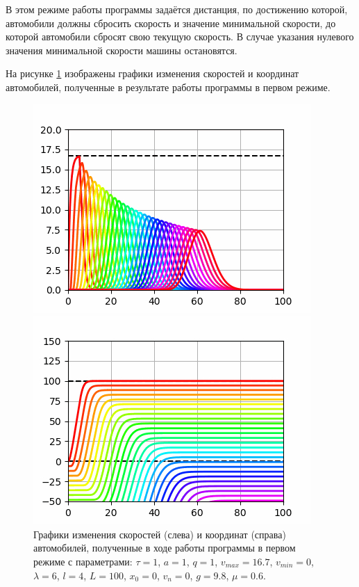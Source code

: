 \documentclass[12pt, a4paper]{extarticle}
\numberwithin{equation}{section}
\numberwithin{figure}{section}
\begin{document}
В этом режиме работы программы задаётся дистанция, по достижению которой, автомобили должны сбросить скорость и значение минимальной скорости, до которой автомобили сбросят свою текущую скорость. В случае указания нулевого значения минимальной скорости машины остановятся.

На рисунке \ref{first_mode} изображены графики изменения скоростей и координат автомобилей, полученные в результате работы программы в первом режиме.

\begin{figure}[h!]
	\begin{center}
		\begin{minipage}[h]{0.48\linewidth}
			\includegraphics[width=1\linewidth]
			{Im/first_mode_speed}
		\end{minipage}
		\hfill 
		\begin{minipage}[h]{0.48\linewidth}
			\includegraphics[width=1\linewidth]
			{Im/first_mode_distance}
		\end{minipage}
	\caption{Графики изменения скоростей (слева) и координат (справа) автомобилей, полученные в ходе работы программы в первом режиме с параметрами: $\tau=1$, $a=1$, $q=1$, $v_{max}=16.7$, $v_{min}=0$, $\lambda=6$, $l=4$, $L=100$, $x_0=0$, $v_n=0$, $g=9.8$, $\mu=0.6$. }
	\label{first_mode}
	\end{center}
\end{figure}
\end{document}
